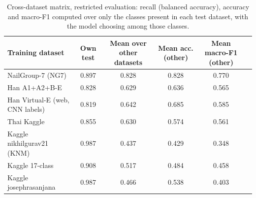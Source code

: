 \begin{table}[!tbp]
\centering
\caption{Cross-dataset matrix, restricted evaluation: recall (balanced accuracy), accuracy and macro-F1 computed over only the classes present in each test dataset, with the model choosing among those classes.}
\label{tab:xsrcsummaryr}
\footnotesize
\begin{tabular}{lccccc}
\hline
Training dataset & Own test & Mean over other datasets & Mean acc. (other) & Mean macro-F1 (other) \\
\hline
NailGroup-7 (NG7) & 0.897 & 0.828 & 0.828 & 0.770 \\
Han A1+A2+B-E & 0.828 & 0.629 & 0.636 & 0.565 \\
Han Virtual-E (web, CNN labels) & 0.819 & 0.642 & 0.685 & 0.585 \\
Thai Kaggle & 0.855 & 0.630 & 0.574 & 0.561 \\
Kaggle nikhilgurav21 (KNM) & 0.987 & 0.437 & 0.429 & 0.348 \\
Kaggle 17-class & 0.908 & 0.517 & 0.484 & 0.458 \\
Kaggle josephrasanjana & 0.987 & 0.466 & 0.538 & 0.403 \\
\hline
\end{tabular}
\end{table}